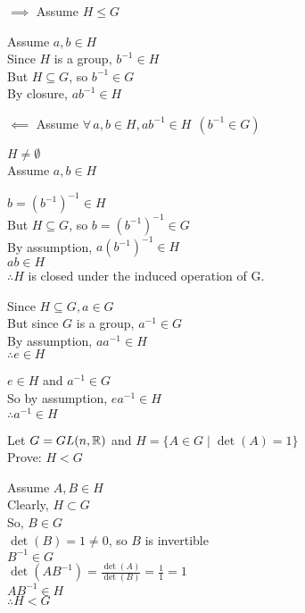 \documentclass[letterpaper,12pt,fleqn]{article}
\begin{document}
\begin{theproof}
  \listbreak
  \begin{description}
  \item{$\implies$ Assume $H\le G$}

    Assume $a,b\in H$ \\
    Since $H$ is a group, $b^{-1}\in H$ \\
    But $H\subseteq G$, so $b^{-1}\in G$ \\
    By closure, $ab^{-1}\in H$
    
  \item{$\impliedby$ Assume
    $\forall\,a,b\in H,ab^{-1}\in H\ \ (b^{-1}\in G)$}

    $H\ne\emptyset$ \\
    Assume $a,b\in H$

    $b=(b^{-1})^{-1}\in H$ \\
    But $H\subseteq G$, so $b=(b^{-1})^{-1}\in G$ \\
    By assumption, $a(b^{-1})^{-1}\in H$ \\
    $ab\in H$ \\
    $\therefore H$ is closed under the induced operation of G.

    Since $H\subseteq G,a\in G$ \\
    But since $G$ is a group, $a^{-1}\in G$ \\
    By assumption, $aa^{-1}\in H$ \\
    $\therefore e\in H$

    $e\in H$ and $a^{-1}\in G$ \\
    So by assumption, $ea^{-1}\in H$ \\
    $\therefore a^{-1}\in H$
  \end{description}
\end{theproof}

\begin{example}
  Let $G=GL(n,\mathbb{R})$ and $H=\{A\in G\mid \det(A)=1\}$ \\
  Prove: $H<G$

  Assume $A,B\in H$ \\
  Clearly, $H\subset G$ \\
  So, $B\in G$ \\
  $\det(B)=1\ne0$, so $B$ is invertible \\
  $B^{-1}\in G$ \\
  $\det(AB^{-1})=\frac{\det(A)}{\det(B)}=\frac{1}{1}=1$ \\
  $AB^{-1}\in H$ \\
  $\therefore H<G$
\end{example}
\end{document}
